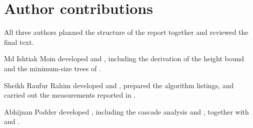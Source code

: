 \section*{Author contributions}

All three authors planned the structure of the report together and reviewed the
final text.

Md Ishtiak Moin developed  and , including the
derivation of the height bound and the minimum-size trees of
.

Sheikh Raufur Rahim developed  and ,
prepared the algorithm listings, and carried out the measurements reported in
.

Abhijnan Podder developed , including the cascade analysis and
, together with  and
.
